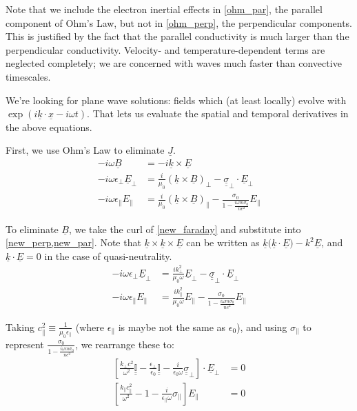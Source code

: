 \documentclass{article}
\begin{document}
Note that we include the electron inertial effects in \cref{ohm_par}, the 
parallel component of Ohm's Law, but not in \cref{ohm_perp}, the perpendicular 
components. This is justified by the fact that the parallel conductivity is 
much larger than the perpendicular conductivity. Velocity- and 
temperature-dependent terms are neglected completely; we are concerned with 
waves much faster than convective timescales. 

We're looking for plane wave solutions: fields which (at least locally) evolve 
with $\exp ( i \underline{k} \cdot \underline{x} - i \omega t)$. That lets us 
evaluate the spatial and temporal derivatives in the above equations. 

First, we use Ohm's Law to eliminate $\underline{J}$. 
\begin{align}
  \label{new_faraday}
  - i \omega \underline{B} &= - i \underline{k} \times \underline{E} \\
  \label{new_perp}
  - i \omega \epsilon_\bot \underline{E}_\bot &= 
    \frac{i}{\mu_0} \left( \underline{k} \times \underline{B} \right)_\bot -
    \underline{\underline{\sigma}}_\bot \cdot \underline{E}_\bot \\
  \label{new_par}
  - i \omega \epsilon_\parallel E_\parallel & = 
    \frac{i}{\mu_0} \left( \underline{k} \times \underline{B} 
      \right)_\parallel -
    \frac{\sigma_0}{1 - \frac{i \omega m \sigma_0}{n e^2}} E_\parallel
\end{align}

To eliminate $\underline{B}$, we take the curl of \cref{new_faraday} and 
substitute into \cref{new_perp,new_par}. Note that 
$\underline{k} \times \underline{k} \times \underline{E}$ 
can be written as 
$\underline{k} \big( \underline{k} \cdot \underline{E} \big) - k^2 
\underline{E}$, 
and 
$\underline{k} \cdot \underline{E} = 0$ 
in the case of quasi-neutrality. 
\begin{align}
  - i \omega \epsilon_\bot \underline{E}_\bot &= 
    \frac{i k_\bot^2}{\mu_0 \omega} 
      \underline{E}_\bot -
    \underline{\underline{\sigma}}_\bot \cdot \underline{E}_\bot \\
  - i \omega \epsilon_\parallel E_\parallel & = 
    \frac{i k_\parallel^2}{\mu_0 \omega} E_\parallel -
    \frac{\sigma_0}{1 - \frac{i \omega m \sigma_0}{n e^2}} E_\parallel
\end{align}

Taking $c_\parallel^2 \equiv \frac{1}{\mu_0 \epsilon_\parallel}$ (where 
$\epsilon_\parallel$ is maybe not the same as $\epsilon_0$), and using 
$\sigma_\parallel$ to represent 
$\frac{\sigma_0}{1 - \frac{i \omega m \sigma_0}{n e^2}}$, 
we rearrange these to:
\begin{align}
  \label{perp_final}
  \left[ \frac{k_\bot c^2}{\omega^2} \underline{\underline{\mathbb{I}}} - 
    \frac{\epsilon_\bot}{\epsilon_0} \underline{\underline{\mathbb{I}}} - 
    \frac{i}{\epsilon_0 \omega} \underline{\underline{\sigma}}_\bot \right] 
    \cdot \underline{E}_\bot &= 0 \\
  \label{par_final}
  \left[ \frac{k_\parallel c_\parallel^2}{\omega^2} - 
    1 - 
    \frac{i}{\epsilon_\parallel \omega} \sigma_\parallel \right] 
    E_\parallel &= 0
\end{align}
\end{document}
